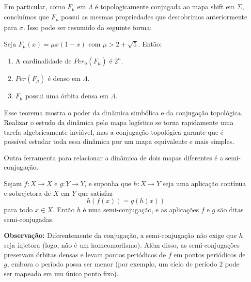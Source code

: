 \documentclass[../IC.tex]{subfiles}
\begin{document}
	Em particular, como $F_\mu$ em $\Lambda$ é topologicamente conjugada ao mapa shift em $\Sigma$, concluímos que $F_\mu$ possui as mesmas propriedades que descobrimos anteriormente para $\sigma$. Isso pode ser resumido da seguinte forma:
	
	\begin{teorema}
		Seja $F_\mu(x) = \mu x(1 - x)$ com $\mu > 2 + \sqrt{5}$. Então:
		\begin{enumerate}
			\item A cardinalidade de $Per_n(F_\mu)$ é $2^n$.
			\item $Per(F_\mu)$ é denso em $\Lambda$.
			\item $F_\mu$ possui uma órbita densa em $\Lambda$.
		\end{enumerate}
	\end{teorema}
	
	Esse teorema mostra o poder da dinâmica simbólica e da conjugação topológica. Realizar o estudo da dinâmica pelo mapa logístico se torna rapidamente uma tarefa algebricamente inviável, mas a conjugação topológica garante que é possível estudar toda essa dinâmica por um mapa equivalente e mais simples.
	
	Outra ferramenta para relacionar a dinâmica de dois mapas diferentes é a semi-conjugação.
	
	\begin{definicao}
		Sejam $f : X \to X$ e $g : Y \to Y$, e suponha que $h : X \to Y$ seja uma aplicação contínua e sobrejetora de $X$ em $Y$ que satisfaz
		$$ h(f(x)) = g(h(x)) $$
		para todo $x \in X$. Então $h$ é uma semi-conjugação, e as aplicações $f$ e $g$ são ditas semi-conjugadas.
	\end{definicao}
	
	\noindent\textbf{Observação:} Diferentemente da conjugação, a semi-conjugação não exige que $h$ seja injetora (logo, não é um homeomorfismo). Além disso, as semi-conjugações preservam órbitas densas e levam pontos periódicos de $f$ em pontos periódicos de $g$, embora o período possa ser menor (por exemplo, um ciclo de período 2 pode ser mapeado em um único ponto fixo).
	
\end{document}

